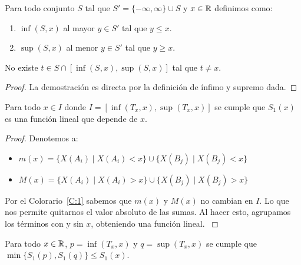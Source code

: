 \begin{definition}
    Para todo conjunto $S$ tal que $S' = \{ -\infty, \infty \} \cup S$ y $x \in \mathbb{R}$ definimos como:

    \begin{enumerate}
        \item $\inf (S, x)$ al mayor $y \in S'$ tal que $y \le x$.
        \item $\sup (S, x)$ al menor $y \in S'$ tal que $y \ge x$.
    \end{enumerate}
\end{definition}

\begin{collorary}
    No existe $t \in S \cap \left[ \inf(S, x), \sup (S, x) \right]$ tal que $t \neq x$.
    \label{C:1}
\end{collorary}

\begin{proof}
    La demostración es directa por la definición de ínfimo y supremo dada.
\end{proof}

\begin{definition}
    Para todo $x \in I$ donde $I = \left[\inf(T_x, x), \sup (T_x, x) \right]$ se cumple que $S_1(x)$ es una función lineal que depende de $x$.
    \label{def_fnok}
\end{definition}

\begin{proof}
    \hfill

    Denotemos a:

    \begin{itemize}[label=\textbullet]
        \item $m(x) = \{ X(A_i) \mid X(A_i) < x \} \cup \{ X(B_j) \mid X(B_j) < x \}$
        \item $M(x) = \{ X(A_i) \mid X(A_i) > x \} \cup \{ X(B_j) \mid X(B_j) > x \}$
    \end{itemize}

    Por el Colorario~\ref{C:1} sabemos que $m(x)$ y $M(x)$ no cambian en $I$. Lo que nos permite quitarnos el valor absoluto de las sumas. Al hacer esto, agrupamos los términos con y sin $x$, obteniendo una función lineal.
    \label{P:linear}
\end{proof}

\begin{definition}
    Para todo $x \in \mathbb{R}$, $p = \inf(T_x, x)$ y $q = \sup(T_x, x)$ se cumple que $\min \{ S_1(p), S_1(q) \} \le S_1(x)$.
    \label{def_mn}
\end{definition}

